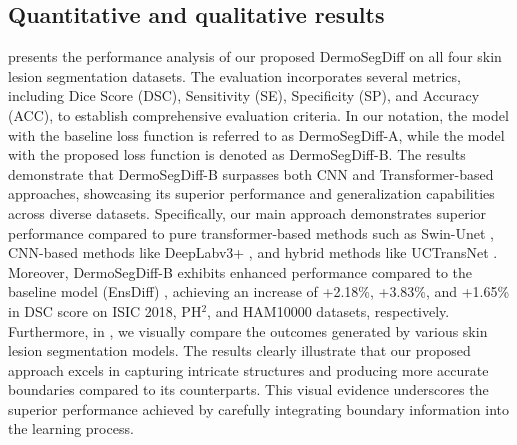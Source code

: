 \documentclass[runningheads]{llncs}
\begin{document}
\subsection{Quantitative and qualitative results}
 presents the performance analysis of our proposed DermoSegDiff on all four skin lesion segmentation datasets. The evaluation incorporates several metrics, including Dice Score (DSC), Sensitivity (SE), Specificity (SP), and Accuracy (ACC), to establish comprehensive evaluation criteria. In our notation, the model with the baseline loss function is referred to as DermoSegDiff-A, while the model with the proposed loss function is denoted as DermoSegDiff-B. The results demonstrate that DermoSegDiff-B surpasses both CNN and Transformer-based approaches, showcasing its superior performance and generalization capabilities across diverse datasets.  Specifically, our main approach demonstrates superior performance compared to pure transformer-based methods such as Swin-Unet \cite{cao2021swin}, CNN-based methods like DeepLabv3+ \cite{chen2018encoder}, and hybrid methods like UCTransNet \cite{wang2022uctransnet}. Moreover, DermoSegDiff-B exhibits enhanced performance compared to the baseline model (EnsDiff) \cite{wolleb2022diffusion}, achieving an increase of +2.18\%, +3.83\%, and +1.65\% in DSC score on ISIC 2018, PH$^2$, and HAM10000 datasets, respectively. Furthermore, in , we visually compare the outcomes generated by various skin lesion segmentation models. The results clearly illustrate that our proposed approach excels in capturing intricate structures and producing more accurate boundaries compared to its counterparts. This visual evidence underscores the superior performance achieved by carefully integrating boundary information into the learning process.
\end{document}
